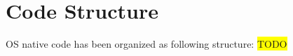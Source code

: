 \chapter{Code Structure}\label{Appx:CodeStructure}
OS native code has been organized as following structure:
\colorbox{yellow}{TODO}

